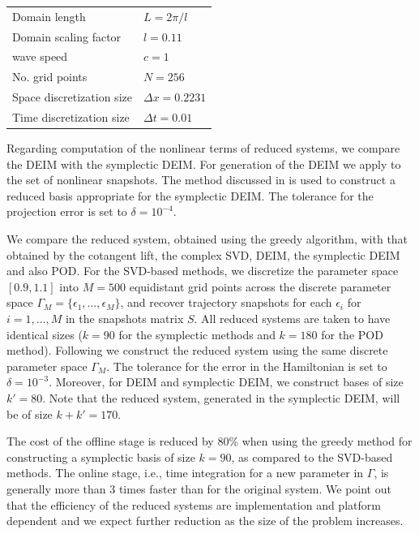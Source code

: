 \vspace{0.5cm}
\begin{center}
\begin{tabular}{|l|l|}
\hline
Domain length & $L = 2\pi /l$ \\
Domain scaling factor & $l = 0.11$ \\
wave speed & $c =1$\\
No. grid points & $N = 256$ \\
Space discretization size & $\Delta x = 0.2231$ \\
Time discretization size & $\Delta t = 0.01$ \\
\hline
\end{tabular}
\end{center}
\vspace{0.5cm}
Regarding computation of the nonlinear terms of reduced systems, we compare the DEIM with the symplectic DEIM. For generation of the DEIM we apply  to the set of nonlinear snapshots. The method discussed in  is used to construct a reduced basis appropriate for the symplectic DEIM. The tolerance for the projection error is set to $\delta = 10^{-4}$.

We compare the reduced system, obtained using the greedy algorithm, with that obtained by the cotangent lift, the complex SVD, DEIM, the symplectic DEIM and also POD. For the SVD-based methods, we discretize the parameter space $[0.9,1.1]$ into $M=500$ equidistant grid points across the discrete parameter space $\Gamma_M = \{\epsilon_1,\dots,\epsilon_M \}$, and recover trajectory snapshots for each $\epsilon_i$ for $i = 1,\dots,M$ in the snapshots matrix $S$. All reduced systems are taken to have identical sizes ($k=90$ for the symplectic methods and $k=180$ for the POD method). Following  we construct the reduced system using the same discrete parameter space $\Gamma_M$. The tolerance for the error in the Hamiltonian is set to $\delta = 10^{-3}$. Moreover, for DEIM and symplectic DEIM, we construct bases of size $k'=80$. Note that the reduced system, generated in the symplectic DEIM, will be of size $k+k'=170$.

The cost of the offline stage is reduced by 80\% when using the greedy method for constructing a symplectic basis of size $k=90$, as compared to the SVD-based methods. The online stage, i.e., time integration for a new parameter in $\Gamma$, is generally more than 3 times faster than for the original system. We point out that the efficiency of the reduced systems are implementation and platform dependent and we expect further reduction as the size of the problem increases.
  
